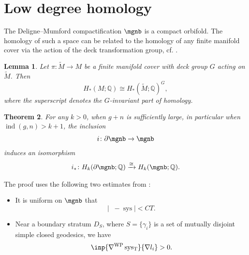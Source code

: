\documentclass[12pt]{amsart}
\newtheorem{theorem}{Theorem}[section]
\newtheorem{lemma}[theorem]{Lemma}
\theoremstyle{remark}
\theoremstyle{definition}
\DeclareMathOperator{\ind}{ind}
\DeclareMathOperator{\sys}{sys}
\DeclareMathOperator{\syst}{sys_T}
\numberwithin{equation}{section}
\begin{document}






\section{Low degree homology}
\label{sec:low-degree-homology}

The Deligne--Mumford compactification $\mgnb$ is a compact orbifold. The homology of such a space can be related to the homology of any finite manifold cover via the action of the deck transformation group, cf. \cite{hatcher_algebraic_2001}.

\begin{lemma}
Let $\pi\colon \widetilde{M}\to M$ be a finite manifold cover with deck group $G$ acting on $\widetilde{M}$. Then
\[
H_*(M;\mathbb Q) \cong H_*(\widetilde{M};\mathbb Q)^G,
\]
where the superscript denotes the $G$-invariant part of homology.
\end{lemma}

\begin{theorem}
\label{isomorphism of low degree homology}
    For any $k>0$, when $g+n$ is sufficiently large, in particular when $\ind(g,n)>k+1$, the inclusion
    \[
    i\colon \partial\mgnb\to\mgnb
    \]
    induces an isomorphism
    \[
    i_*\colon H_k(\partial \mgnb;\mathbb Q) \xrightarrow{\cong} H_k(\mgnb;\mathbb Q).
    \]
\end{theorem}


The proof uses the following two estimates from \cite{chen2023morse}:
\begin{itemize}
    \item It is uniform on $\mgnb$ that
    \[
    |\syst-\sys|<CT.
    \]
    \item Near a boundary stratum $D_S$, where $S=\{\gamma_i\}$ is a set of mutually disjoint simple closed geodesics, we have
    \[
    \inp{\nabla^{\text{WP}}\syst}{\nabla l_i}>0.
    \]
\end{itemize}
\end{document}
